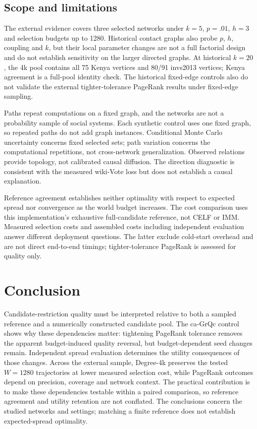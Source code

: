 \documentclass[smallextended]{svjour3}
\begin{document}
\subsection{Scope and limitations}
The external evidence covers three selected networks under $k=5$, $p=.01$, $h=3$ and selection budgets up to 1280. Historical contact graphs also probe $p$, $h$, coupling and $k$, but their local parameter changes are not a full factorial design and do not establish sensitivity on the larger directed graphs. At historical $k=20$, the 4k pool contains all 75 Kenya vertices and 80/91 invs2013 vertices; Kenya agreement is a full-pool identity check. The historical fixed-edge controls also do not validate the external tighter-tolerance PageRank results under fixed-edge sampling.

Paths repeat computations on a fixed graph, and the networks are not a probability sample of social systems. Each synthetic control uses one fixed graph, so repeated paths do not add graph instances. Conditional Monte Carlo uncertainty concerns fixed selected sets; path variation concerns the computational repetitions, not cross-network generalization. Observed relations provide topology, not calibrated causal diffusion. The direction diagnostic is consistent with the measured wiki-Vote loss but does not establish a causal explanation.

Reference agreement establishes neither optimality with respect to expected spread nor convergence as the world budget increases. The cost comparison uses this implementation's exhaustive full-candidate reference, not CELF or IMM. Measured selection costs and assembled costs including independent evaluation answer different deployment questions. The latter exclude cold-start overhead and are not direct end-to-end timings; tighter-tolerance PageRank is assessed for quality only.

\section{Conclusion}
Candidate-restriction quality must be interpreted relative to both a sampled reference and a numerically constructed candidate pool. The ca-GrQc control shows why these dependencies matter: tightening PageRank tolerance removes the apparent budget-induced quality reversal, but budget-dependent seed changes remain. Independent spread evaluation determines the utility consequences of those changes. Across the external sample, Degree-4k preserves the tested $W=1280$ trajectories at lower measured selection cost, while PageRank outcomes depend on precision, coverage and network context. The practical contribution is to make these dependencies testable within a paired comparison, so reference agreement and utility retention are not conflated. The conclusions concern the studied networks and settings; matching a finite reference does not establish expected-spread optimality.
\end{document}
